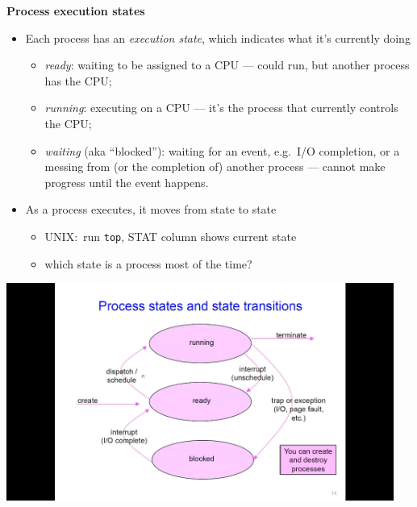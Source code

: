 \documentclass[11pt,a4paper]{article}
\begin{document}
\textbf{Process execution states}
\begin{itemize}
    \item Each process has an \emph{execution state}, which indicates what it's currently doing
        \begin{itemize}
            \item \emph{ready}: waiting to be assigned to a CPU ---
                could run, but another process has the CPU;\
            \item \emph{running}: executing on a CPU ---
                it's the process that currently controls the CPU;\
            \item \emph{waiting} (aka ``blocked''): waiting for an event, e.g.\ I/O completion,
                or a messing from (or the completion of) another process ---
                cannot make progress until the event happens.
        \end{itemize}
    \item As a process executes, it moves from state to state
        \begin{itemize}
            \item UNIX:\ run \texttt{top}, STAT column shows current state
            \item which state is a process most of the time?
        \end{itemize}
\end{itemize}

\includegraphics[height=270]{process-states-and-state-transitions.jpg}
\end{document}
